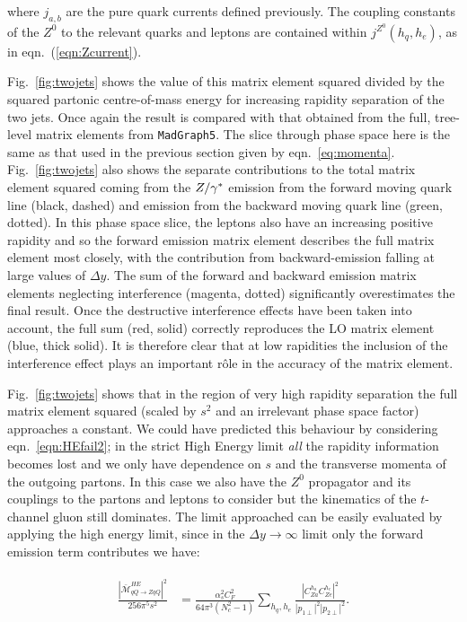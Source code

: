 		where $j_{a,b}$ are the pure quark currents defined previously.  The
		coupling constants of the $Z^0$ to the relevant quarks and leptons are contained
		within $j^{Z^0}(h_q,h_e)$, as in eqn.~(\eqref{eqn:Zcurrent}).

		Fig.~\eqref{fig:twojets} shows the value of this matrix element squared divided by the squared partonic
		centre-of-mass energy for increasing rapidity separation of the two jets. Once again the
		result is compared with that obtained from the full, tree-level matrix elements from
		\texttt{MadGraph5}.  The slice through phase space here is the same as that used in the
		previous section given by eqn.~\eqref{eq:momenta}.  Fig.~\eqref{fig:twojets} also
		shows the separate contributions to the total matrix element squared coming from the
		$Z/\gamma^*$ emission from the forward moving quark line (black, dashed) and emission
		from the backward moving quark line (green, dotted).  In this phase space slice,
		the leptons also have an increasing positive rapidity and so the forward emission
		matrix element describes the full matrix element most closely, with the contribution
		from backward-emission falling at large values of $\Delta y$.  The sum of the forward
		and backward emission matrix elements neglecting interference (magenta, dotted)
		significantly overestimates the final result.  Once the destructive interference
		effects have been taken into account, the full sum (red, solid) correctly reproduces
		the LO matrix element (blue, thick solid).  It is therefore clear that at low
		rapidities the inclusion of the interference effect plays an important r\^ole in
		the accuracy of the matrix element.

		Fig.~\eqref{fig:twojets} shows that in the region of very high rapidity separation
		the full matrix element squared (scaled by $s^2$ and an irrelevant phase space factor)
		approaches a constant.  We could have predicted this behaviour by considering
		eqn.~\eqref{eqn:HEfail2}; in the strict High Energy limit \emph{all} the rapidity
		information becomes lost and we only have dependence on $s$ and the transverse
		momenta of the outgoing partons.  In this case we also have the $Z^0$ propagator
		and its couplings to the partons and leptons to consider but the kinematics of the
		$t$-channel gluon still dominates.  The limit approached can be easily evaluated
		by applying the high energy limit, since in the $\Delta y\to\infty$ limit only
		the forward emission term contributes we have:

		\begin{align}
		\begin{split}
			\frac{{|\bar{\mathcal{M}}_{qQ\to ZqQ}^{HE}|}^2}{256\pi^5s^2} &= \frac{\alpha_s^2C_F^2}{64\pi^3(N_c^2-1)}
			\sum_{h_q, h_e}\frac{|C_{Za}^{h_a}C_{Ze}^{h_e}|^2}{|p_{1\perp}|^2|p_{2\perp}|^2}.
			\label{eqn:zLimit}
		\end{split}
		\end{align}

